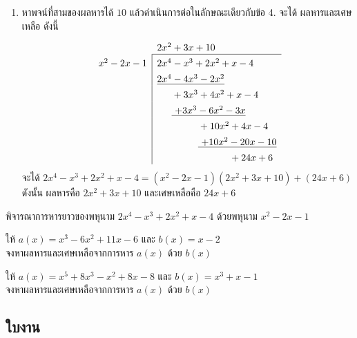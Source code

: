 \begin{conceptbox}
\begin{enumerate}
		\item หาพจน์ที่สามของผลหารได้ $10$ แล้วดำเนินการต่อในลักษณะเดียวกับข้อ 4. จะได้ ผลหารและเศษเหลือ ดังนี้
		\[
		\setlength{\extrarowheight}{1.0ex} %
		\begin{array}{r|l}
			\multicolumn{1}{c}{} & 2x^2 + 3x + 10 \\ \cline{2-2}
			x^2 - 2x - 1 & 2x^4 - x^3 + 2x^2 + x - 4 \\
			& \underline{2x^4 - 4x^3 - 2x^2} \\
			& \phantom{2x^4} + 3x^3 + 4x^2 + x - 4 \\
			& \phantom{2x^4} \underline{\ + 3x^3 - 6x^2 - 3x} \\
			& \phantom{2x^4 + 3x^3} + 10x^2 + 4x - 4 \\
			& \phantom{2x^4 + 3x^3} \underline{\ + 10x^2 - 20x - 10} \\
			& \phantom{2x^4 + 3x^3 + 10x^2} + 24x + 6
		\end{array}
		\]
		\vspace{0.5em}
		จะได้ $2x^4 - x^3 + 2x^2 + x - 4 = (x^2 - 2x - 1)(2x^2 + 3x + 10) + (24x + 6)$
		\newline
		ดังนั้น ผลหารคือ $2x^2 + 3x + 10$ และเศษเหลือคือ $24x + 6$
	\end{enumerate}
\end{conceptbox}
\newpage
\begin{examplebox}
พิจารณาการหารยาวของพหุนาม $2x^4 - x^3 + 2x^2 + x - 4$ ด้วยพหุนาม $x^2 - 2x - 1$
\end{examplebox}
\solution
\newpage

\begin{examplebox}
	ให้ $a(x) = x^{3}-6x^{2}+11x-6$ และ $b(x) = x-2$ \\
	จงหาผลหารและเศษเหลือจากการหาร $a(x)$ ด้วย $b(x)$
\end{examplebox}
\solution
\newpage

\begin{examplebox}
	ให้ $a(x) = x^{5}+8x^{3}-x^{2}+8x-8$ และ $b(x) = x^{3}+x-1$ \\
	จงหาผลหารและเศษเหลือจากการหาร $a(x)$ ด้วย $b(x)$
\end{examplebox}
\solution
\newpage

\subsection*{ใบงาน}

